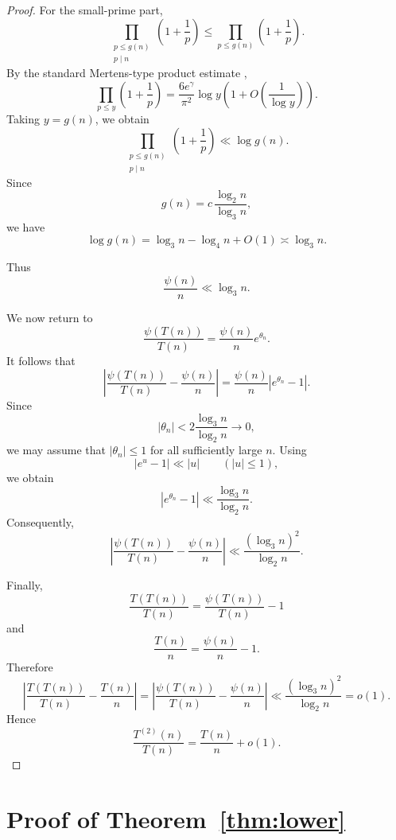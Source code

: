\documentclass{article}
\begin{document}
\begin{proof}
For the small-prime part,
\[
\prod_{\substack{p\le g(n)\\p\mid n}}
\left(1+\frac1p\right)
\le
\prod_{p\le g(n)}
\left(1+\frac1p\right).
\]
By the standard Mertens-type product estimate
\cite{ref9,ref14},
\[
\prod_{p\le y}
\left(1+\frac1p\right)
=
\frac{6e^\gamma}{\pi^2}\log y
\left(
1+O\left(\frac1{\log y}\right)
\right).
\]
Taking $y=g(n)$, we obtain
\[
\prod_{\substack{p\le g(n)\\p\mid n}}
\left(1+\frac1p\right)
\ll
\log g(n).
\]
Since
\[
g(n)
=
c\,\frac{\log_2n}{\log_3n},
\]
we have
\[
\log g(n)
=
\log_3n-\log_4n+O(1)
\asymp
\log_3n.
\]

Thus
\begin{equation}
\frac{\psi(n)}n
\ll
\log_3n.
\label{eq:psiT-psi-upper}
\end{equation}

We now return to
\[
\frac{\psi(T(n))}{T(n)}
=
\frac{\psi(n)}n e^{\theta_n}.
\]
It follows that
\[
\left|
\frac{\psi(T(n))}{T(n)}
-
\frac{\psi(n)}n
\right|
=
\frac{\psi(n)}n
\left|e^{\theta_n}-1\right|.
\]
Since
\[
|\theta_n|
<
2\frac{\log_3n}{\log_2n}
\longrightarrow0,
\]
we may assume that $|\theta_n|\le1$ for all sufficiently large $n$.
Using
\[
|e^u-1|\ll|u|
\qquad(|u|\le1),
\]
we obtain
\[
\left|e^{\theta_n}-1\right|
\ll
\frac{\log_3n}{\log_2n}.
\]
Consequently,
\[
\left|
\frac{\psi(T(n))}{T(n)}
-
\frac{\psi(n)}n
\right|
\ll
\frac{(\log_3n)^2}{\log_2n}.
\]

Finally,
\[
\frac{T(T(n))}{T(n)}
=
\frac{\psi(T(n))}{T(n)}-1
\]
and
\[
\frac{T(n)}n
=
\frac{\psi(n)}n-1.
\]
Therefore
\[
\left|
\frac{T(T(n))}{T(n)}
-
\frac{T(n)}n
\right|
=
\left|
\frac{\psi(T(n))}{T(n)}
-
\frac{\psi(n)}n
\right|
\ll
\frac{(\log_3n)^2}{\log_2n}
=
o(1).
\]
Hence
\[
\frac{T^{(2)}(n)}{T(n)}
=
\frac{T(n)}n+o(1).
\]
\end{proof}


\section{Proof of Theorem~\ref{thm:lower}}
\label{sec:lower-bound}
\end{document}

